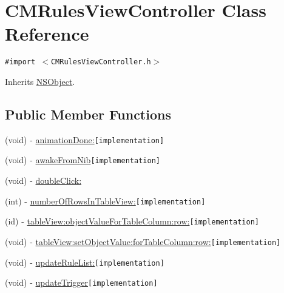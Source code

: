 \hypertarget{interface_c_m_rules_view_controller}{
\section{CMRulesViewController Class Reference}
\label{interface_c_m_rules_view_controller}
}
{\tt \#import $<$CMRulesViewController.h$>$}

Inherits \hyperlink{class_n_s_object}{NSObject}.

\subsection*{Public Member Functions}
\begin{CompactItemize}
\item 
(void) - \hyperlink{interface_c_m_rules_view_controller_8a78381207d0ccc077468c8d58345d3f}{animationDone:}{\tt  \mbox{[}implementation\mbox{]}}
\item 
(void) - \hyperlink{interface_c_m_rules_view_controller_62e036822b9cdb8fc4a5621e4b8f5410}{awakeFromNib}{\tt  \mbox{[}implementation\mbox{]}}
\item 
(void) - \hyperlink{interface_c_m_rules_view_controller_06431433b50af112217d1e368b22d884}{doubleClick:}
\item 
(int) - \hyperlink{interface_c_m_rules_view_controller_b55de149fb96787ab46ce0d37e0d45a8}{numberOfRowsInTableView:}{\tt  \mbox{[}implementation\mbox{]}}
\item 
(id) - \hyperlink{interface_c_m_rules_view_controller_4da6fe124a27e394012a3f174c1c5119}{tableView:objectValueForTableColumn:row:}{\tt  \mbox{[}implementation\mbox{]}}
\item 
(void) - \hyperlink{interface_c_m_rules_view_controller_7fa971e307cfeb2a3393dfeb12ceae86}{tableView:setObjectValue:forTableColumn:row:}{\tt  \mbox{[}implementation\mbox{]}}
\item 
(void) - \hyperlink{interface_c_m_rules_view_controller_9fef190c8951a9381a37c36be99505fa}{updateRuleList:}{\tt  \mbox{[}implementation\mbox{]}}
\item 
(void) - \hyperlink{interface_c_m_rules_view_controller_6d2a8b5f182e84bd6a2b6a9d43b3d7d4}{updateTrigger}{\tt  \mbox{[}implementation\mbox{]}}
\end{CompactItemize}
